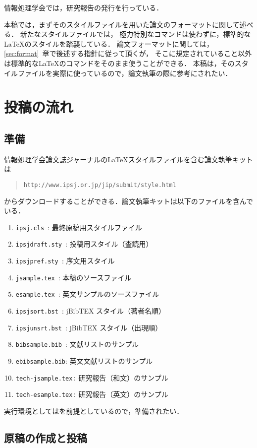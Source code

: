 \documentclass[submit,techrep,noauthor]{ipsj}
\def\|{\verb|}
\begin{document}
情報処理学会では，研究報告の発行を行っている．

本稿では，まずそのスタイルファイルを用いた論文のフォーマットに関して述べる．
新たなスタイルファイルでは，
極力特別なコマンドは使わずに，標準的な\LaTeX のスタイルを踏襲している．
論文フォーマットに関しては，\ref{sec:format}~章で後述する指針に従って頂くが，
そこに規定されていること以外は標準的な\LaTeX のコマンドをそのまま使うことができる．
本稿は，そのスタイルファイルを実際に使っているので，論文執筆の際に参考にされたい．

%2
\section{投稿の流れ}

%2.1
\subsection{準備}

情報処理学会論文誌ジャーナルの\LaTeX スタイルファイルを含む論文執筆キットは
\begin{quote}
	\small
	\|http://www.ipsj.or.jp/jip/submit/style.html|
\end{quote}
からダウンロードすることができる．論文執筆キットは以下のファイルを含んで
いる．
\begin{enumerate}
	\item \|ipsj.cls |: 最終原稿用スタイルファイル
	\item \|ipsjdraft.sty |: 投稿用スタイル（査読用）
	\item \|ipsjpref.sty |: 序文用スタイル
	\item \|jsample.tex |: 本稿のソースファイル
	\item \|esample.tex |: 英文サンプルのソースファイル
	\item \|ipsjsort.bst |: jBibTEX スタイル（著者名順）
	\item \|ipsjunsrt.bst |: jBibTEX スタイル（出現順）
	\item \|bibsample.bib |: 文献リストのサンプル
	\item \|ebibsample.bib|: 英文文献リストのサンプル
	\item \|tech-jsample.tex:| 研究報告（和文）のサンプル
	\item \|tech-esample.tex:| 研究報告（英文）のサンプル
\end{enumerate}
実行環境としては\LaTeXe を前提としているので，準備されたい．

\subsection{原稿の作成と投稿}
\end{document}
